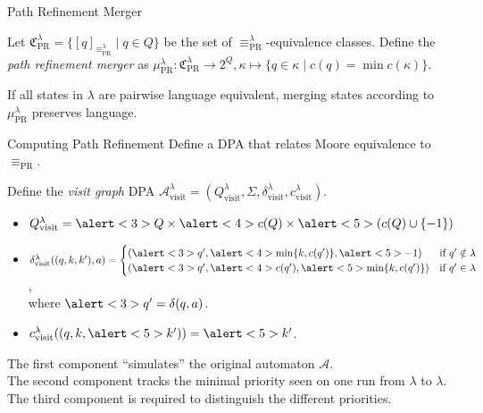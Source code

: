 \begin{frame}{Path Refinement Merger}
\begin{defn}
	Let $\mathfrak{C}_\text{PR}^\lambda = \{ [q]_{\equiv_\text{PR}^\lambda} \mid q \in Q \}$ be the set of $\equiv_\text{PR}^\lambda$-equivalence classes. Define the \emph{path refinement merger} as $\mu_\text{PR}^\lambda : \mathfrak{C}_\text{PR}^\lambda \rightarrow 2^Q, \kappa \mapsto \{ q \in \kappa \mid c(q) = \min c(\kappa) \}$.
\end{defn}

\begin{theorem}
	If all states in $\lambda$ are pairwise language equivalent, merging states according to $\mu_\text{PR}^\lambda$ preserves language.
\end{theorem}
\end{frame}


\begin{frame}{Computing Path Refinement}
	Define a DPA that relates Moore equivalence to $\equiv_\text{PR}$.
	\vspace{.2cm}
	\pause

	\begin{defn}
		Define the \emph{visit graph} DPA $\mathcal{A}_\text{visit}^\lambda = (Q_\text{visit}^\lambda, \Sigma, \delta_\text{visit}^\lambda, c_\text{visit}^\lambda)$.
		\begin{itemize}
			\item $Q_\text{visit}^\lambda = \alert<3>{Q} \times \alert<4>{c(Q)} \times \alert<5>{(c(Q) \cup \{-1\})}$
			\item $\delta^\lambda_\text{visit}((q, k, k'), a) = \begin{cases}
				(\alert<3>{q'}, \alert<4>{\min \{k, c(q')\}}, \alert<5>{-1}) & \text{if } q' \notin \lambda \\
				(\alert<3>{q'}, \alert<4>{c(q')}, \alert<5>{\min \{k, c(q')\}}) & \text{if } q' \in \lambda
			\end{cases}$, \\ where $\alert<3>{q' = \delta(q, a)}$.
			\item $c_\text{visit}^\lambda((q, k, \alert<5>{k'})) = \alert<5>{k'}$.
		\end{itemize}
	\end{defn}
	
	\vspace{.5cm}
	
	The \alert<3>{first} component \enquote{simulates} the original automaton $\mathcal{A}$. \\
	The \alert<4>{second} component tracks the minimal priority seen on one run from $\lambda$ to $\lambda$. \\
	The \alert<5>{third} component is required to distinguish the different priorities.
\end{frame}


